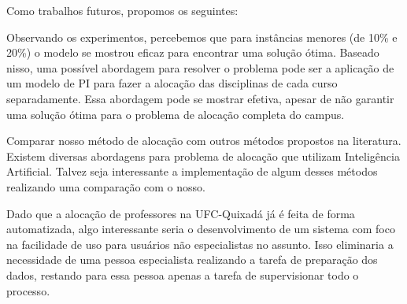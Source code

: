 Como trabalhos futuros, propomos os seguintes:
\begin{alineascomponto}
\item Observando os experimentos, percebemos que para instâncias menores (de 10\% e 20\%) o modelo se mostrou eficaz para encontrar uma solução ótima. Baseado nisso, uma possível abordagem para resolver o problema pode ser a aplicação de um modelo de PI para fazer a alocação das disciplinas de cada curso separadamente. Essa abordagem pode se mostrar efetiva, apesar de não garantir uma solução ótima para o problema de alocação completa do campus.
\item Comparar nosso método de alocação com outros métodos propostos na literatura. Existem diversas abordagens para problema de alocação que utilizam Inteligência Artificial. Talvez seja interessante a implementação de algum desses métodos realizando uma comparação com o nosso.
\item Dado que a alocação de professores na UFC-Quixadá já é feita de forma automatizada, algo interessante seria o desenvolvimento de um sistema com foco na facilidade de uso para usuários não especialistas no assunto. Isso eliminaria a necessidade de uma pessoa especialista realizando a tarefa de preparação dos dados, restando para essa pessoa apenas a tarefa de supervisionar todo o processo.
\end{alineascomponto}